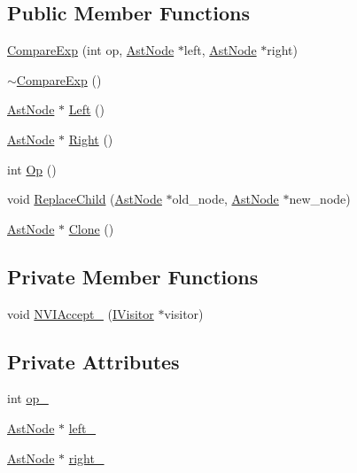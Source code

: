\subsection*{Public Member Functions}
\begin{DoxyCompactItemize}
\item 
\hyperlink{classmocha_1_1_compare_exp_adf897019057c5828d58dc5383fbccd2f}{CompareExp} (int op, \hyperlink{classmocha_1_1_ast_node}{AstNode} $\ast$left, \hyperlink{classmocha_1_1_ast_node}{AstNode} $\ast$right)
\item 
\hyperlink{classmocha_1_1_compare_exp_a12393cc341813a99ce920a6c52c128df}{$\sim$CompareExp} ()
\item 
\hyperlink{classmocha_1_1_ast_node}{AstNode} $\ast$ \hyperlink{classmocha_1_1_compare_exp_af2325d02bad82741358315768d3222b9}{Left} ()
\item 
\hyperlink{classmocha_1_1_ast_node}{AstNode} $\ast$ \hyperlink{classmocha_1_1_compare_exp_a6a65fd900ebf9dd11484a6a948c4c4e2}{Right} ()
\item 
int \hyperlink{classmocha_1_1_compare_exp_a46d240a58be68fa85b61073ed2e4d19a}{Op} ()
\item 
void \hyperlink{classmocha_1_1_compare_exp_af174065f2d4986e2c7539bd041baad13}{ReplaceChild} (\hyperlink{classmocha_1_1_ast_node}{AstNode} $\ast$old\_\-node, \hyperlink{classmocha_1_1_ast_node}{AstNode} $\ast$new\_\-node)
\item 
\hyperlink{classmocha_1_1_ast_node}{AstNode} $\ast$ \hyperlink{classmocha_1_1_compare_exp_afa00b970faa937c81cfc15c9a0170558}{Clone} ()
\end{DoxyCompactItemize}
\subsection*{Private Member Functions}
\begin{DoxyCompactItemize}
\item 
void \hyperlink{classmocha_1_1_compare_exp_a48c63840dc4ab4b2504eb805bcf76f77}{NVIAccept\_\-} (\hyperlink{classmocha_1_1_i_visitor}{IVisitor} $\ast$visitor)
\end{DoxyCompactItemize}
\subsection*{Private Attributes}
\begin{DoxyCompactItemize}
\item 
int \hyperlink{classmocha_1_1_compare_exp_abfc7d2878bb4843805ce5677ca5c7776}{op\_\-}
\item 
\hyperlink{classmocha_1_1_ast_node}{AstNode} $\ast$ \hyperlink{classmocha_1_1_compare_exp_a0498ddaaf7647a878e984afe6bf029c6}{left\_\-}
\item 
\hyperlink{classmocha_1_1_ast_node}{AstNode} $\ast$ \hyperlink{classmocha_1_1_compare_exp_a75ad5e6ec8152bd2391044bda81b8948}{right\_\-}
\end{DoxyCompactItemize}


